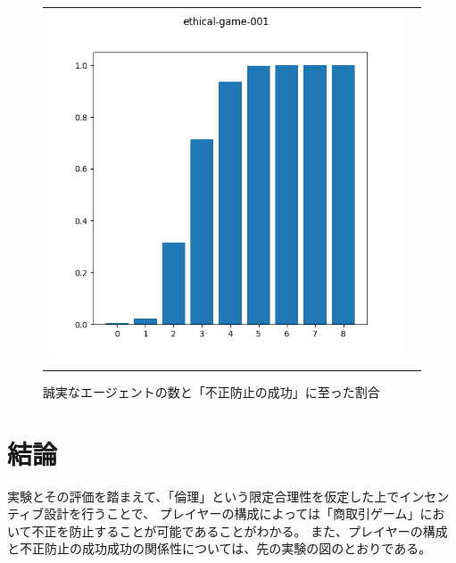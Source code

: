 \begin{figure}[h]
  \begin{tabular}{cc}
    \begin{minipage}[t]{1\hsize}
      \centering
      \includegraphics[keepaspectratio, width=1\linewidth]{./06_ethical-commerce-game/ethical-game-001.png}
      \caption{誠実なエージェントの数と「不正防止の成功」に至った割合}
      \label{ethical-game-001}
    \end{minipage}
  \end{tabular}
\end{figure}

\section{結論}
実験とその評価を踏まえて、「倫理」という限定合理性を仮定した上でインセンティブ設計を行うことで、
プレイヤーの構成によっては「商取引ゲーム」において不正を防止することが可能であることがわかる。
また、プレイヤーの構成と不正防止の成功成功の関係性については、先の実験の図のとおりである。

\clearpage


% 